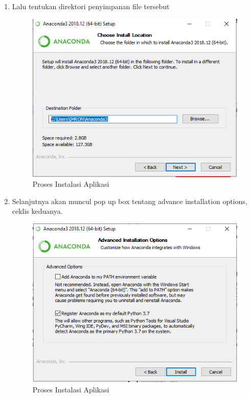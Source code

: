 \begin{enumerate}
\item Lalu tentukan direktori penyimpanan file tersebut
\begin{figure}[ht]
\centering
\includegraphics[scale=0.7]{figures/5.png}
\caption{Proses Instalasi Aplikasi}
\end{figure}

\item Selanjutnya akan muncul pop up box tentang advance installation options, ceklis keduanya.
\begin{figure}[ht]
\centering
\includegraphics[scale=0.7]{figures/6.png}
\caption{Proses Instalasi Aplikasi}
\end{figure}


\end{enumerate}
